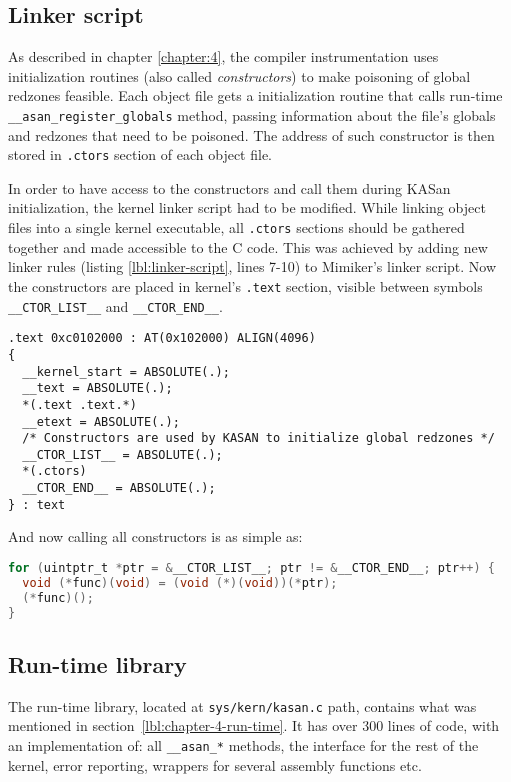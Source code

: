 \documentclass[shortabstract, manyadvisors, english, mgr]{iithesis}
\theoremstyle{definition} \newtheorem*{definition}{Definicja}
\theoremstyle{definition} \newtheorem*{example}{Przykład}
\theoremstyle{definition} \newtheorem*{remark}{Uwaga}
\begin{document}
\subsection{Linker script}
As described in chapter \ref{chapter:4}, the compiler instrumentation uses initialization routines (also called \textit{constructors}) to make poisoning of global redzones feasible. Each object file gets a initialization routine that calls run-time \texttt{\_\_asan\_register\_globals} method, passing information about the file's globals and redzones that need to be poisoned. The address of such constructor is then stored in \texttt{.ctors} section of each object file.

In order to have access to the constructors and call them during KASan initialization, the kernel linker script \cite{bib:linker-script} had to be modified. While linking object files into a single kernel executable, all \texttt{.ctors} sections should be gathered together and made accessible to the C code. This was achieved by adding new linker rules (listing \ref{lbl:linker-script}, lines 7-10) to Mimiker's linker script. Now the constructors are placed in kernel's \texttt{.text} section, visible between symbols \texttt{\_\_CTOR\_LIST\_\_} and \texttt{\_\_CTOR\_END\_\_}.

\begin{lstlisting}[caption={A fragment of the kernel linker script from file \texttt{sys/mips/malta.ld}. Lines 7-10 were added.}, label={lbl:linker-script}]
.text 0xc0102000 : AT(0x102000) ALIGN(4096)
{
  __kernel_start = ABSOLUTE(.);
  __text = ABSOLUTE(.);
  *(.text .text.*)
  __etext = ABSOLUTE(.);
  /* Constructors are used by KASAN to initialize global redzones */
  __CTOR_LIST__ = ABSOLUTE(.);
  *(.ctors)
  __CTOR_END__ = ABSOLUTE(.);
} : text
\end{lstlisting}

And now calling all constructors is as simple as:
\begin{lstlisting}[language=C, caption={A fragment of function \texttt{call\_ctors} from file \texttt{sys/kern/kasan.c}.}]
for (uintptr_t *ptr = &__CTOR_LIST__; ptr != &__CTOR_END__; ptr++) {
  void (*func)(void) = (void (*)(void))(*ptr);
  (*func)();
}
\end{lstlisting}

\subsection{Run-time library}
The run-time library, located at \texttt{sys/kern/kasan.c} path, contains what was mentioned in section~\ref{lbl:chapter-4-run-time}. It has over 300 lines of code, with an implementation of: all \texttt{\_\_asan\_*} methods, the interface for the rest of the kernel, error reporting, wrappers for several assembly functions etc.
\end{document}

